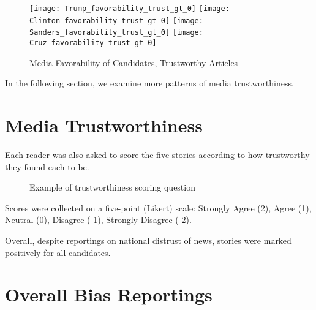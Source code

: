 \begin{figure}[h!] 
\centering
  \texttt{[image: Trump\_favorability\_trust\_gt\_0]} 
  \texttt{[image: Clinton\_favorability\_trust\_gt\_0]} 
  \texttt{[image: Sanders\_favorability\_trust\_gt\_0]} 
  \texttt{[image: Cruz\_favorability\_trust\_gt\_0]} 
  \caption{Media Favorability of Candidates, Trustworthy Articles}
\end{figure}

In the following section, we examine more patterns of media trustworthiness.


\section{Media Trustworthiness}

Each reader was also asked to score the five stories according to how trustworthy they found each to be. 

\begin{figure}[h!] 
\centering
  \caption{Example of trustworthiness scoring question}
\end{figure}

Scores were collected on a five-point (Likert) scale: Strongly Agree (2), Agree (1), Neutral (0), Disagree (-1), Strongly Disagree (-2).

Overall, despite reportings on national distrust of news, stories were marked positively for all candidates.

\section{Overall Bias Reportings}


%
 